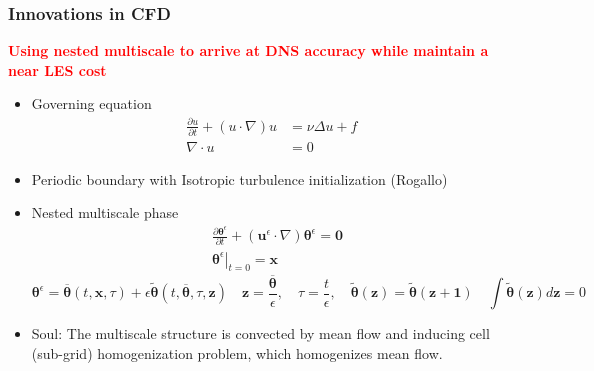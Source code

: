 \documentclass[aspectratio=169]{beamer}
\begin{document}
\begin{frame}[c]\frametitle{Innovations in CFD}
	\textbf{\textcolor{red}{Using nested multiscale to arrive at DNS accuracy while maintain a near LES cost}}
	\begin{itemize}
		\item Governing equation
		\begin{align*}
			\frac{\partial u}{\partial t}+(u\cdot{\nabla})u &= \nu\Delta u + f\\
			\nabla\cdot u &= 0
		\end{align*}
		\item Periodic boundary with Isotropic turbulence initialization (Rogallo)
		\item Nested multiscale phase 
		$$
		\begin{aligned}
			& \frac{\partial \boldsymbol{\theta}^\epsilon}{\partial t}+\left(\mathbf{u}^\epsilon \cdot \nabla\right) \boldsymbol{\theta}^\epsilon=\mathbf{0} \\
			& \left.\boldsymbol{\theta}^\epsilon\right|_{t=0}=\mathbf{x}
		\end{aligned}
		$$
		\begin{equation*}
			\boldsymbol{\theta}^\epsilon=\overline{\boldsymbol{\theta}}(t, \mathbf{x}, \tau)+\epsilon \widetilde{\boldsymbol{\theta}}(t, \overline{\boldsymbol{\theta}}, \tau, \mathbf{z})\quad \mathbf{z}=\frac{\overline{\boldsymbol{\theta}}}{\epsilon}, \quad \tau=\frac{t}{\epsilon},\quad \tilde{\boldsymbol{\theta}}(\boldsymbol{z}) = \tilde{\boldsymbol{\theta}}(\boldsymbol{z}+\boldsymbol{1})\quad \int\tilde{\boldsymbol{\theta}}(\boldsymbol{z}) d\boldsymbol{z} = 0
		\end{equation*}
		\item Soul: The multiscale structure is convected by mean flow and inducing cell (sub-grid) homogenization problem, which homogenizes mean flow.
	\end{itemize}
\end{frame}
\end{document}
